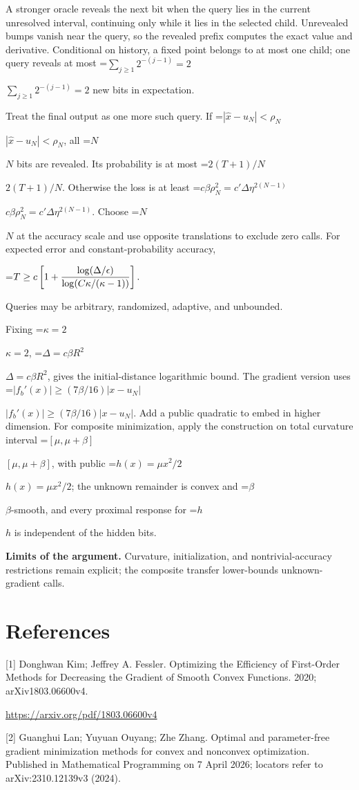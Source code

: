 \documentclass[10pt,a4paper]{article}
\newcommand{\AtlasMath}[1]{\par\begingroup\centering\setbox0=\hbox{$\displaystyle #1$}\ifdim\wd0>1.4\linewidth\typeout{ATLAS WIDE FORMULA: \the\wd0}\fi\ifdim\wd0>\linewidth\resizebox{\linewidth}{!}{\box0}\else\box0\fi\par\endgroup}
\newcommand{\AtlasInlineMath}[1]{\begingroup\setbox0=\hbox{$#1$}\ifdim\wd0>.4\linewidth\endgroup\AtlasMath{#1}\else\endgroup$#1$\fi}
\begin{document}
A stronger oracle reveals the next bit when the query lies in the current unresolved interval, continuing only while it lies in the selected child. Unrevealed bumps vanish near the query, so the revealed prefix computes the exact value and derivative. Conditional on history, a fixed point belongs to at most one child; one query reveals at most \AtlasInlineMath{\sum_{j\ge1}2^{-(j-1)}=2} new bits in expectation.

Treat the final output as one more such query. If \AtlasInlineMath{|\widehat x-u_N|<\rho_N}, all \AtlasInlineMath{N} bits are revealed. Its probability is at most \AtlasInlineMath{2(T+1)/N}. Otherwise the loss is at least
\AtlasInlineMath{c\beta\rho_N^2=c'\Delta\eta^{2(N-1)}}.
Choose \AtlasInlineMath{N} at the accuracy scale and use opposite translations to exclude zero calls. For expected error and constant-probability accuracy,

\AtlasMath{T\ge c\left[1+{\log(\Delta/\epsilon)\over
\log(C\kappa/(\kappa-1))}\right].}

Queries may be arbitrary, randomized, adaptive, and unbounded.

Fixing \AtlasInlineMath{\kappa=2}, \AtlasInlineMath{\Delta=c\beta R^2}, gives the initial-distance logarithmic bound. The gradient version uses
\AtlasInlineMath{|f_b'(x)|\ge(7\beta/16)|x-u_N|}.
Add a public quadratic to embed in higher dimension. For composite minimization, apply the construction on total curvature interval \AtlasInlineMath{[\mu,\mu+\beta]}, with public \AtlasInlineMath{h(x)=\mu x^2/2}; the unknown remainder is convex and \AtlasInlineMath{\beta}-smooth, and every proximal response for \AtlasInlineMath{h} is independent of the hidden bits.

\textbf{Limits of the argument.} Curvature, initialization, and nontrivial-accuracy restrictions remain explicit; the composite transfer lower-bounds unknown-gradient calls.

\section{References}
[1] Donghwan Kim; Jeffrey A. Fessler. Optimizing the Efficiency of First-Order Methods for Decreasing the Gradient of Smooth Convex Functions. 2020; arXiv1803.06600v4.

\url{https://arxiv.org/pdf/1803.06600v4}

[2] Guanghui Lan; Yuyuan Ouyang; Zhe Zhang. Optimal and parameter-free gradient minimization methods for convex and nonconvex optimization. Published in Mathematical Programming on 7 April 2026; locators refer to arXiv:2310.12139v3 (2024).
\end{document}
